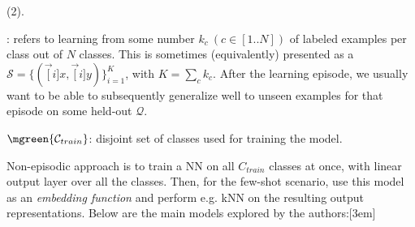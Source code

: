 \documentclass[11pt]{article}
\begin{document}


 (2). 
\begin{compactitem}
	\item {}: refers to learning from some number $k_c ~ (c \in [1..N])$ of labeled examples per class out of $N$ classes. This is sometimes (equivalently) presented as a  $\mathcal S = \{  (\vec[i]{x}, \vec[i]{y}) \}_{i=1}^K$, with $K = \sum_c k_c$. After the learning episode, we usually want to be able to subsequently generalize well to unseen examples for that episode on some held-out  $\mathcal Q$. 
	
	\item  $ \mgreen{ \mathcal{C}_{train}  }  $: disjoint set of classes used for training the model. 
\end{compactitem}
Non-episodic approach is to train a NN on all $C_{train}$ classes at once, with linear output layer over all the classes. Then, for the few-shot scenario, use this model as an \textit{embedding function} and perform e.g. kNN on the resulting output representations. Below are the main models explored by the authors:[3em]
\end{document}
